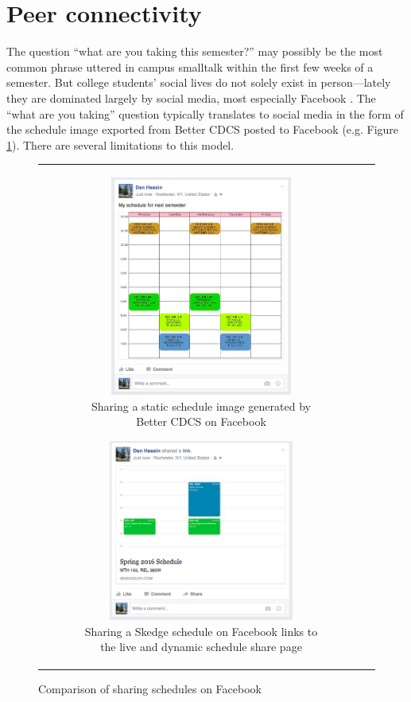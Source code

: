 
\section{Peer connectivity}

The question ``what are you taking this semester?'' may possibly be the most common phrase uttered in campus smalltalk within the first few weeks of a semester. But college students' social lives do not solely exist in person---lately they are dominated largely by social media, most especially Facebook \cite{fb}. The ``what are you taking'' question typically translates to social media in the form of the schedule image exported from Better CDCS posted to Facebook (e.g. Figure \ref{fig:cdcs-social}). There are several limitations to this model.

\begin{figure}[H]
  \centering
  \vspace{5pt}
  \begin{tabular}{c c}

    \begin{subfigure}[w]{7cm}
      \centering
      \includegraphics[width=6cm]{images/cdcs/social}
      \caption{Sharing a static schedule image generated by Better CDCS on Facebook} \label{fig:cdcs-social}
    \end{subfigure}

    \hspace{10pt}

    \begin{subfigure}[w]{7cm}
      \centering
      \includegraphics[width=6.1cm]{images/skedge/facebook}
      \caption{Sharing a Skedge schedule on Facebook links to the live and dynamic schedule share page} \label{fig:sk-fb}
    \end{subfigure}

  \end{tabular}
  \caption{Comparison of sharing schedules on Facebook}
\end{figure}

